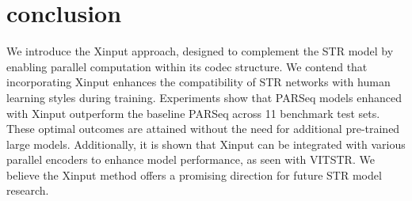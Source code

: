 \documentclass[runningheads]{llncs}
\begin{document}
\section{conclusion}
We introduce the Xinput approach, designed to complement the STR model by enabling parallel computation within its codec structure.	We contend that incorporating Xinput enhances the compatibility of STR networks with human learning styles during training.	Experiments show that PARSeq models enhanced with Xinput outperform the baseline PARSeq across 11 benchmark test sets.	These optimal outcomes are attained without the need for additional pre-trained large models.	Additionally, it is shown that Xinput can be integrated with various parallel encoders to enhance model performance, as seen with VITSTR.	We believe the Xinput method offers a promising direction for future STR model research.	



\end{document}
